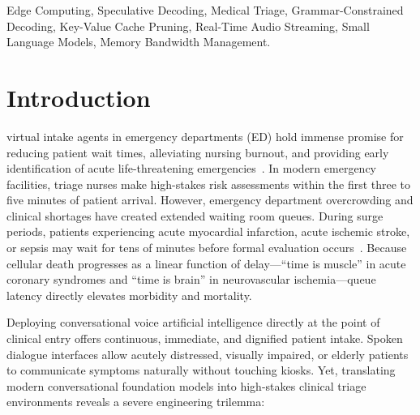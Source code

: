 \documentclass[10pt,journal,compsoc]{IEEEtran}
\begin{document}
{\begin{abstract}
and an in-memory Aho-Corasick pre-TTS malpractice guardrail. Across an exhaustive benchmark of $60$ clinical vignettes, $100$ adversarial probes, and $20$ invariant trajectories, OmniSpec-Triage delivers a median glass-to-glass turnaround of $1{,}370.0$\,ms ($595.5$\,ms on speculative commits), sub-second voice latency ($737.5$\,ms mean,
$981.0$\,ms $P_{95}$), $100.0\%$ schema conformance, $100.0\%$ guardrail interception, $94.4\%$ allergy needle retention, and near-perfect physician acuity concordance ($\kappa = 0.9272$) with zero critical under-triage, while permanently locking resident VRAM at $3{,}075.0$\,MB on consumer edge GPUs.
\end{abstract}

\begin{IEEEkeywords}
Edge Computing, Speculative Decoding, Medical Triage, Grammar-Constrained Decoding, Key-Value Cache Pruning, Real-Time Audio Streaming, Small Language Models, Memory Bandwidth Management.
\end{IEEEkeywords}}

\maketitle
\IEEEdisplaynontitleabstractindextext
\IEEEpeerreviewmaketitle

\section{Introduction}
 virtual intake agents in emergency departments (ED) hold immense promise for reducing patient wait times, alleviating nursing burnout, and providing early identification of acute life-threatening emergencies~\cite{menon2024xai}. In modern emergency facilities, triage nurses make high-stakes risk assessments within the first three to five minutes of patient arrival. However, emergency department overcrowding and clinical shortages have created extended waiting room queues. During surge periods, patients experiencing acute myocardial infarction, acute ischemic stroke, or sepsis may wait for tens of minutes before formal evaluation occurs~\cite{singhal2023medpalm2}. Because cellular death progresses as a linear function of delay---``time is muscle'' in acute coronary syndromes and ``time is brain'' in neurovascular ischemia---queue latency directly elevates morbidity and mortality.

Deploying conversational voice artificial intelligence directly at the point of clinical entry offers continuous, immediate, and dignified patient intake. Spoken dialogue interfaces allow acutely distressed, visually impaired, or elderly patients to communicate symptoms naturally without touching kiosks. Yet, translating modern
conversational foundation models into high-stakes clinical triage environments reveals a severe engineering trilemma:
\end{document}

